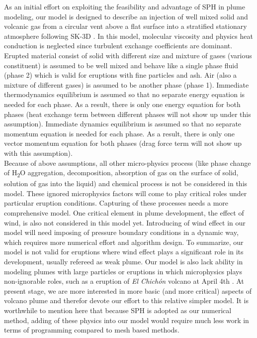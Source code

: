 \documentclass[journal abbreviation, manuscript]{copernicus}
\begin{document}
As an initial effort on exploiting the feasibility and advantage of SPH in plume modeling, our model is designed to describe an injection of well mixed solid and volcanic gas from a circular vent above a flat surface into a stratified stationary atmosphere following SK-3D \citep{suzuki2005numerical}. In this model, molecular viscosity and physics heat conduction is neglected since turbulent exchange coefficients are dominant. Erupted material consist of solid with different size and mixture of gases (various constituent) is assumed to be well mixed and behave like a single phase fluid (phase 2) which is valid for eruptions with fine particles and ash. Air (also a mixture of different gases) is assumed to be another phase (phase 1). Immediate thermodynamics equilibrium is assumed so that no separate energy equation is needed for each phase. As a result, there is only one energy equation for both phases (heat exchange term between different phases will not show up under this assumption). Immediate dynamics equilibrium is assumed so that no separate momentum equation is needed for each phase. As a result, there is only one vector momentum equation for both phases (drag force term will not show up with this assumption). \\
Because of above assumptions, all other micro-physics process (like phase change of  \texorpdfstring{H\textsubscript{2}O}, aggregation, decomposition, absorption of gas on the surface of solid, solution of gas into the liquid) and chemical process is not be considered in this model. These ignored microphysics factors will come to play critical roles under particular eruption conditions. Capturing of these processes needs a more comprehensive model. One critical element in plume development, the effect of wind, is also not considered in this model yet. Introducing of wind effect in our model will need imposing of pressure boundary conditions in a dynamic way, which requires more numerical effort and algorithm design. To summarize, our model is not valid for eruptions where wind effect plays a significant role in its development, usually refereed as weak plume. Our model is also lack ability in modeling plumes with large particles or eruptions in which microphysics plays non-ignorable roles, such as a eruption of \textit{El Chich{\'o}n} volcano at April 4th \citep{sigurdsson19841982, folch2016fplume}. At present stage, we are more interested in more basic (and more critical) aspects of volcano plume and therefor devote our effort to this relative simpler model. It is worthwhile to mention here that because SPH is adopted as our numerical method, adding of these physics into our model would require much less work in terms of programming compared to mesh based methods.\\
\end{document}

